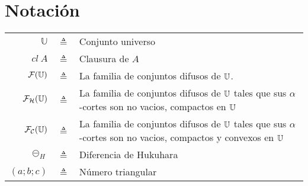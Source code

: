 \chapter*{Notación}
\begin{table}[htbp]
  \centering %
  \begin{tabular}{r c p{10cm} }
    \toprule
    $\mathbb{U}$ & $\triangleq$ & Conjunto universo\\
    $cl~A$ &  $\triangleq$ & Clausura de $A$ \\
    $\mathcal{F}(\mathbb U)$ & $\triangleq$ & La familia de conjuntos difusos de $\mathbb U$.\\
    $\mathcal{F}_\mathcal{H}(\mathbb U)$ & $\triangleq$ & La familia de conjuntos difusos de $\mathbb U$ tales que sus $\alpha$-cortes son no vacios, compactos en $\mathbb U$ \\
    $\mathcal{F}_\mathcal{C}(\mathbb U)$ & $\triangleq$ & La familia de conjuntos difusos de $\mathbb U$ tales que sus $\alpha$-cortes son no vacios, compactos y convexos en $\mathbb U$ \\
    $\circleddash_H $ & $\triangleq$ & Diferencia de Hukuhara \\
    $(a;b;c)$ & $\triangleq$ & Número triangular \\
    \bottomrule
  \end{tabular}
  \label{tab:notacion}
\end{table}
